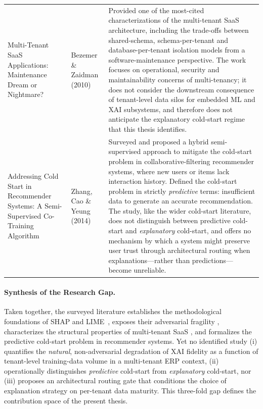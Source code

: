 \begin{table}[h]
\begin{tabularx}{\textwidth}{@{}p{3.4cm} p{2.7cm} X@{}}
Multi-Tenant SaaS Applications: Maintenance Dream or Nightmare?
& Bezemer \& Zaidman (2010)
& Provided one of the most-cited characterizations of the multi-tenant SaaS
architecture, including the trade-offs between shared-schema, schema-per-tenant
and database-per-tenant isolation models from a software-maintenance
perspective. The work focuses on operational, security and maintainability
concerns of multi-tenancy; it does not consider the downstream consequence of
tenant-level data silos for embedded ML and XAI subsystems, and therefore does
not anticipate the explanatory cold-start regime that this thesis identifies. \\

Addressing Cold Start in Recommender Systems: A Semi-Supervised Co-Training
Algorithm
& Zhang, Cao \& Yeung (2014)
& Surveyed and proposed a hybrid semi-supervised approach to mitigate the
cold-start problem in collaborative-filtering recommender systems, where new
users or items lack interaction history. Defined the cold-start problem in
strictly \emph{predictive} terms: insufficient data to generate an accurate
recommendation. The study, like the wider cold-start literature, does not
distinguish between predictive cold-start and \emph{explanatory} cold-start,
and offers no mechanism by which a system might preserve user trust through
architectural routing when explanations---rather than predictions---become
unreliable. \\
\bottomrule
\end{tabularx}
\end{table}

\paragraph{Synthesis of the Research Gap.}
Taken together, the surveyed literature establishes the methodological
foundations of SHAP and LIME~\citep{lundberg2017unified, ribeiro2016why},
exposes their adversarial fragility \citep[Slack \emph{et al.},][]{rudin2019stop},
characterizes the structural properties of multi-tenant SaaS
\citep{bezemer2010multi}, and formalizes the predictive cold-start problem in
recommender systems. Yet no identified study (i) quantifies the \emph{natural},
non-adversarial degradation of XAI fidelity as a function of tenant-level
training-data volume in a multi-tenant ERP context, (ii) operationally
distinguishes \emph{predictive} cold-start from \emph{explanatory} cold-start,
nor (iii) proposes an architectural routing gate that conditions the choice of
explanation strategy on per-tenant data maturity. This three-fold gap defines
the contribution space of the present thesis.

